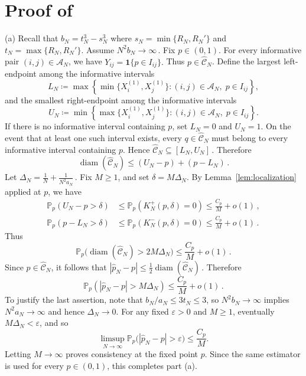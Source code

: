 \documentclass[ECP,preprint]{ejpecp} %
\newcommand{\1}{\mathbf 1}
\newcommand{\PP}{\mathbb P}
\newcommand{\diam}{\operatorname{diam}}
\newcommand{\cA}{\mathcal A}
\newcommand{\cC}{\mathcal C}
\begin{document}
\section{Proof of~\texorpdfstring{}{}}

\noindent (a) Recall that \( b_N = t_N^3 - s_N^3 \) where \( s_N = \min\{ R_N, R_N' \} \) and \( t_N = \max \{ R_N, R_N' \} \). Assume
\(
    N^2b_N\to\infty \, .
\)
Fix \(p\in(0,1)\). For every informative pair \((i,j)\in\cA_N\), we have
\(
    Y_{ij}
    =
    \1\{p\in I_{ij}\}.
\)
Thus \(p\in\widehat{\cC}_N\).
%
Define the largest left-endpoint among the informative intervals
\[
    L_N
    \coloneqq
    \max\left\{
        \min\{X_i^{(1)},X_j^{(1)}\}:
        (i,j)\in\cA_N,\;
        p\in I_{ij}
    \right\},
\]
and the smallest right-endpoint among the informative intervals
\[
    U_N
    \coloneqq
    \min\left\{
        \max\{X_i^{(1)},X_j^{(1)}\}:
        (i,j)\in\cA_N,\;
        p\in I_{ij}
    \right\}.
\]
If there is no informative interval containing \(p\), set \(L_N=0\) and \(U_N=1\).  On the event that at least one such interval exists, every \(q\in\widehat{\cC}_N\) must belong to every informative interval containing \(p\).  Hence
\(
    \widehat{\cC}_N\subseteq [L_N,U_N] \, .
\)
Therefore
\[
    \diam(\widehat{\cC}_N)
    \le
    (U_N-p)+(p-L_N) \, .
\]
%
Let
\(
    \Delta_N
    =
    \frac1N+\frac{1}{N^2a_N} \, .
\)
Fix \(M\ge1\), and set \(\delta=M\Delta_N\).  By Lemma~\ref{lem:localization} applied at \(p\), we have
\begin{align*}
    \PP_p(U_N-p>\delta)
    & \le
    \PP_p\left(K_N^+(p,\delta)=0\right)
    \le
    \frac{C_p}{M}+o(1) \, ,
    \\
    \PP_p(p-L_N>\delta)
    & \le
    \PP_p\left(K_N^-(p,\delta)=0\right)
    \le
    \frac{C_p}{M}+o(1) \, .
\end{align*}
Thus
\[
    \PP_p\Big(
        \diam(\widehat{\cC}_N)>2M\Delta_N
    \Big)
    \le
    \frac{C_p}{M}+o(1) \, .
\]
Since \(p\in\widehat{\cC}_N\), it follows that
\(
    |\widehat p_N-p|
    \le
    \frac12\diam(\widehat{\cC}_N) \, .
\)
Therefore
\[
    \PP_p\left(
        |\widehat p_N-p|> M\Delta_N
    \right)
    \le
    \frac{C_p}{M}+o(1) \, .
\]
To justify the last assertion, note that \(b_N/a_N\le3t_N\le3\), so \(N^2b_N\to\infty\) implies \(N^2a_N\to\infty\) and hence \(\Delta_N\to0\). For any fixed \(\varepsilon>0\) and \(M\ge1\), eventually \(M\Delta_N<\varepsilon\), and so
\[
    \limsup_{N\to\infty}
    \PP_p\bigl(|\widehat p_N-p|>\varepsilon\bigr)
    \le \frac{C_p}{M}.
\]
Letting \(M\to\infty\) proves consistency at the fixed point \(p\). Since the same estimator is used for every \(p\in(0,1)\), this completes part (a).
\end{document}
